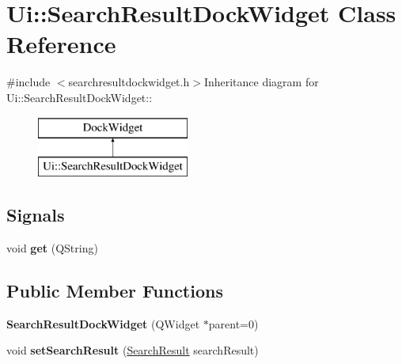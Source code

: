 \hypertarget{classUi_1_1SearchResultDockWidget}{
\section{Ui::SearchResultDockWidget Class Reference}
\label{classUi_1_1SearchResultDockWidget}
}


{\ttfamily \#include $<$searchresultdockwidget.h$>$}Inheritance diagram for Ui::SearchResultDockWidget::\begin{figure}[H]
\begin{center}
\leavevmode
\includegraphics[height=2cm]{classUi_1_1SearchResultDockWidget}
\end{center}
\end{figure}
\subsection*{Signals}
\begin{DoxyCompactItemize}
\item 
\hypertarget{classUi_1_1SearchResultDockWidget_a78ccc630b2e7424260ebcaaadac6d224}{
void {\bfseries get} (QString)}
\label{classUi_1_1SearchResultDockWidget_a78ccc630b2e7424260ebcaaadac6d224}

\end{DoxyCompactItemize}
\subsection*{Public Member Functions}
\begin{DoxyCompactItemize}
\item 
\hypertarget{classUi_1_1SearchResultDockWidget_aeab561f24d348845000eec367db9c380}{
{\bfseries SearchResultDockWidget} (QWidget $\ast$parent=0)}
\label{classUi_1_1SearchResultDockWidget_aeab561f24d348845000eec367db9c380}

\item 
\hypertarget{classUi_1_1SearchResultDockWidget_a155af9b4322fb51ad433146ee9d3ccaa}{
void {\bfseries setSearchResult} (\hyperlink{classSearchResult}{SearchResult} searchResult)}
\label{classUi_1_1SearchResultDockWidget_a155af9b4322fb51ad433146ee9d3ccaa}

\end{DoxyCompactItemize}
